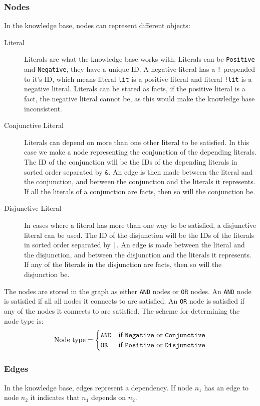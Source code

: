 \documentclass[11pt]{article}
\begin{document}
\subsubsection{Nodes}
In the knowledge base, nodes can represent different objects:
\begin{description}
	\item[Literal] Literals are what the knowledge base works with. Literals can be {\tt Positive} and {\tt Negative}, they have a unique ID. A negative literal has a {\tt !} prepended to it's ID, which means literal {\tt lit} is a positive literal and literal {\tt !lit} is a negative literal. Literals can be stated as facts, if the positive literal is a fact, the negative literal cannot be, as this would make the knowledge base inconsistent.
	
	\item[Conjunctive Literal] Literals can depend on more than one other literal to be satisfied. In this case we make a node representing the conjunction of the depending literals. The ID of the conjunction will be the IDs of the depending literals in sorted order separated by {\tt \&}. An edge is then made between the literal and the conjunction, and between the conjunction and the literals it represents. If all the literals of a conjunction are facts, then so will the conjunction be.
	
	\item[Disjunctive Literal] In cases where a literal has more than one way to be satisfied, a disjunctive literal can be used. The ID of the disjunction will be the IDs of the literals in sorted order separated by {\tt |}. An edge is made between the literal and the disjunction, and between the disjunction and the literals it represents. If any of the literals in the disjunction are facts, then so will the disjunction be.
\end{description}

The nodes are stored in the graph as either {\tt AND} nodes or {\tt OR} nodes. An {\tt AND} node is satisfied if all all nodes it connects to are satisfied. An {\tt OR} node is satisfied if any of the nodes it connects to are satisfied. The scheme for determining the node type is:
$$
\text{Node type} = \begin{cases}
  {\text{\tt AND}} & \text{if {\tt Negative} or {\tt Conjunctive}} \\
  {\text {\tt OR}} & \text{if {\tt Positive} or {\tt Disjunctive}}
\end{cases}
$$

\subsubsection{Edges}
In the knowledge base, edges represent a dependency. If node $n_1$ has an edge to node $n_2$ it indicates that $n_1$ depends on $n_2$.
\end{document}
